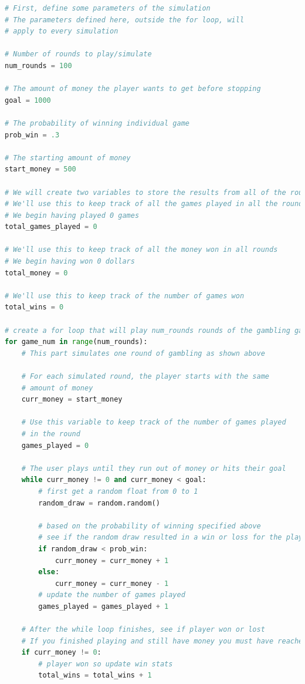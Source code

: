 \documentclass[]{article}
\begin{document}
\begin{lstlisting}[language=python]
# First, define some parameters of the simulation
# The parameters defined here, outside the for loop, will
# apply to every simulation

# Number of rounds to play/simulate
num_rounds = 100

# The amount of money the player wants to get before stopping
goal = 1000

# The probability of winning individual game
prob_win = .3

# The starting amount of money
start_money = 500

# We will create two variables to store the results from all of the rounds played
# We'll use this to keep track of all the games played in all the rounds
# We begin having played 0 games 
total_games_played = 0

# We'll use this to keep track of all the money won in all rounds
# We begin having won 0 dollars
total_money = 0

# We'll use this to keep track of the number of games won
total_wins = 0

# create a for loop that will play num_rounds rounds of the gambling game
for game_num in range(num_rounds):
    # This part simulates one round of gambling as shown above
    
    # For each simulated round, the player starts with the same
    # amount of money
    curr_money = start_money
    
    # Use this variable to keep track of the number of games played
    # in the round
    games_played = 0
    
    # The user plays until they run out of money or hits their goal
    while curr_money != 0 and curr_money < goal:
        # first get a random float from 0 to 1
        random_draw = random.random()
        
        # based on the probability of winning specified above
        # see if the random draw resulted in a win or loss for the player
        if random_draw < prob_win:
            curr_money = curr_money + 1
        else:
            curr_money = curr_money - 1
        # update the number of games played
        games_played = games_played + 1
            
    # After the while loop finishes, see if player won or lost
    # If you finished playing and still have money you must have reached goal
    if curr_money != 0:
        # player won so update win stats
        total_wins = total_wins + 1
        

\end{lstlisting}
\end{document}
